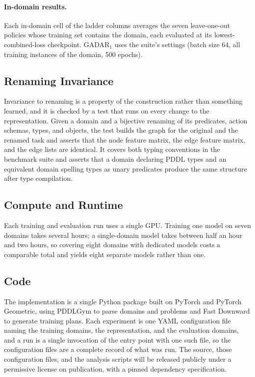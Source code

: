 \documentclass{article} %
\newcommand{\gadar}{GADAR}                 %
\begin{document}
\paragraph{In-domain results.} Each in-domain cell of the ladder columns
averages the seven leave-one-out policies whose training set contains the
domain, each evaluated at its lowest-combined-loss checkpoint.
\gadar{}$_1$ uses the
suite's settings (batch size 64, all training instances of the domain,
500 epochs).

\subsection{Renaming Invariance}
\label{app:invariance}

Invariance to renaming is a property of the construction rather than
something learned, and it is checked by a test that runs on every change to
the representation. Given a domain and a bijective renaming of its
predicates, action schemas, types, and objects, the test builds the graph for
the original and the renamed task and asserts that the node feature matrix,
the edge feature matrix, and the edge lists are identical. It covers both
typing conventions in the benchmark suite and asserts that a domain declaring
PDDL types and an equivalent domain spelling types as unary predicates
produce the same structure after type compilation.

\subsection{Compute and Runtime}
\label{app:compute}

Each training and evaluation run uses a single GPU. Training one model on seven domains takes several hours; a single-domain model takes between half an hour and two hours, so
covering eight domains with dedicated models costs a comparable total and
yields eight separate models rather than one.


\subsection{Code}
\label{app:code}

The implementation is a single Python package built on PyTorch and PyTorch
Geometric, using PDDLGym to parse domains and problems and Fast Downward
\citep{fast_downward} to generate training plans. Each experiment is one YAML
configuration file naming the training domains, the representation, and the
evaluation domains, and a run is a single invocation of the entry point with
one such file, so the configuration files are a complete record of what was
run. The source, those configuration files, and the analysis scripts will be
released publicly under a permissive license on publication, with a pinned
dependency specification.
\end{document}
